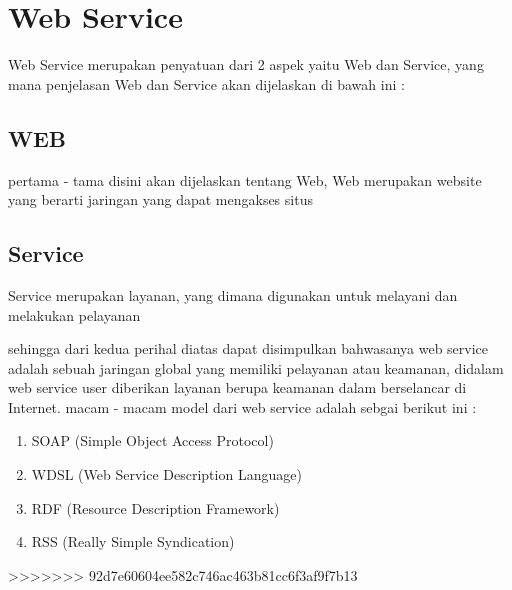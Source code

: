 \section{Web Service}
Web Service merupakan penyatuan dari 2 aspek yaitu Web dan Service, yang mana penjelasan Web dan Service akan dijelaskan di bawah ini :

\subsection{WEB}
pertama - tama disini akan dijelaskan tentang Web, Web merupakan website yang berarti jaringan yang dapat mengakses situs

\subsection{Service}
Service merupakan layanan, yang dimana digunakan untuk melayani dan melakukan pelayanan

sehingga dari kedua perihal diatas dapat disimpulkan bahwasanya web service adalah sebuah jaringan global yang memiliki pelayanan atau keamanan,
didalam web service user diberikan layanan berupa keamanan dalam berselancar di Internet. macam - macam model dari web service adalah sebgai berikut ini :

\begin{enumerate}
\item SOAP (Simple Object Access Protocol)
\item WDSL (Web Service Description Language)
\item RDF (Resource Description Framework)
\item RSS (Really Simple Syndication)
\end {enumerate}
>>>>>>> 92d7e60604ee582c746ac463b81cc6f3af9f7b13




		

